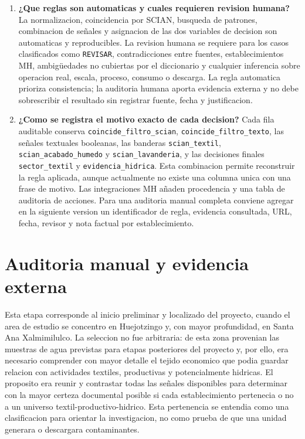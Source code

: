 \documentclass[11pt,letterpaper]{article}
\begin{document}
\begin{enumerate}
    \item \textbf{¿Que reglas son automaticas y cuales requieren revision humana?}
    La normalizacion, coincidencia por SCIAN, busqueda de patrones, combinacion de señales y asignacion de las dos variables de decision son automaticas y reproducibles. La revision humana se requiere para los casos clasificados como \texttt{REVISAR}, contradicciones entre fuentes, establecimientos MH, ambigüedades no cubiertas por el diccionario y cualquier inferencia sobre operacion real, escala, proceso, consumo o descarga. La regla automatica prioriza consistencia; la auditoria humana aporta evidencia externa y no debe sobrescribir el resultado sin registrar fuente, fecha y justificacion.

    \item \textbf{¿Como se registra el motivo exacto de cada decision?}
    Cada fila auditable conserva \texttt{coincide\_filtro\_scian}, \texttt{coincide\_filtro\_texto}, las señales textuales booleanas, las banderas \texttt{scian\_textil}, \texttt{scian\_acabado\_humedo} y \texttt{scian\_lavanderia}, y las decisiones finales \texttt{sector\_textil} y \texttt{evidencia\_hidrica}. Esta combinacion permite reconstruir la regla aplicada, aunque actualmente no existe una columna unica con una frase de motivo. Las integraciones MH añaden procedencia y una tabla de auditoria de acciones. Para una auditoria manual completa conviene agregar en la siguiente version un identificador de regla, evidencia consultada, URL, fecha, revisor y nota factual por establecimiento.
\end{enumerate}

\section{Auditoria manual y evidencia externa}

Esta etapa corresponde al inicio preliminar y localizado del proyecto, cuando el area de estudio se concentro en Huejotzingo y, con mayor profundidad, en Santa Ana Xalmimilulco. La seleccion no fue arbitraria: de esta zona provenian las muestras de agua previstas para etapas posteriores del proyecto y, por ello, era necesario comprender con mayor detalle el tejido economico que podia guardar relacion con actividades textiles, productivas y potencialmente hidricas. El proposito era reunir y contrastar todas las señales disponibles para determinar con la mayor certeza documental posible si cada establecimiento pertenecia o no a un universo textil-productivo-hidrico. Esta pertenencia se entendia como una clasificacion para orientar la investigacion, no como prueba de que una unidad generara o descargara contaminantes.
\end{document}
